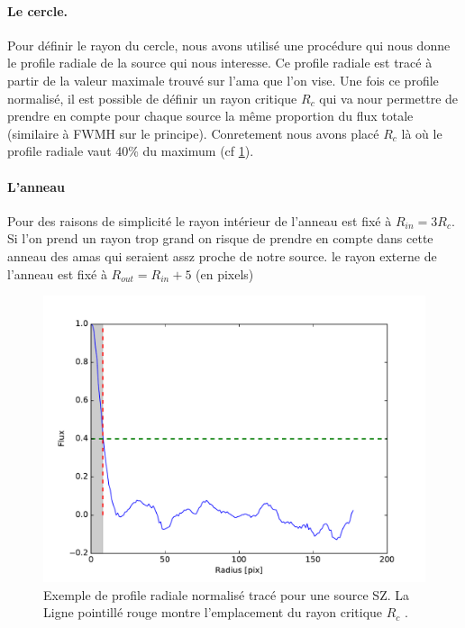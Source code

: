 \documentclass[a4paper,11pt]{article}
\begin{document}
\paragraph{Le cercle.} Pour définir le rayon du cercle, nous avons utilisé une procédure qui nous donne le
profile radiale de la source qui nous interesse. Ce profile radiale est tracé à partir de la valeur maximale trouvé
sur l'ama que l'on vise. Une fois ce profile normalisé, il est possible de définir un rayon critique
$R_c$ qui va nour permettre de prendre en compte pour chaque source la même proportion du flux totale
(similaire à FWMH sur le principe). Conretement nous avons placé $R_c$ là où le profile radiale vaut 40\% du maximum
(cf \ref{profile radial}). \\ 

\paragraph{L'anneau} Pour des raisons de simplicité le rayon intérieur de l'anneau 
est fixé à $R_{in} = 3R_c $. Si l'on prend un rayon trop grand on risque de prendre en compte dans cette
anneau des amas qui seraient assz proche de notre source.  le rayon externe de l'anneau est fixé à 
$R_{out} = R_{in} + 5  $ (en pixels)

\begin{figure}[h!]
  \centering
  \label{profile radial}
  \includegraphics[scale = 0.5]{profile_radiale_ama.pdf}
  \caption{Exemple de profile radiale normalisé tracé pour une source SZ. La Ligne pointillé rouge montre 
  l'emplacement du rayon critique $R_c$ .}
\end{figure}
\end{document}
